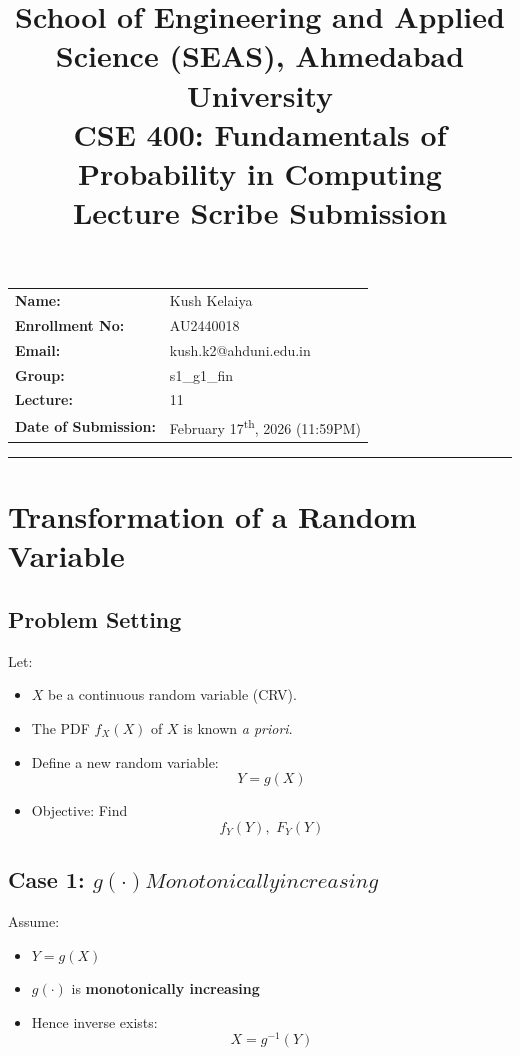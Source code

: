 \documentclass[11pt]{article}
\title{
	\normalsize School of Engineering and Applied Science (SEAS), Ahmedabad University \\
	\vspace{0.2cm}
	\textbf{CSE 400: Fundamentals of Probability in Computing}\\
	\Large Lecture Scribe Submission
}
\author{}
\date{}
\begin{document}
\maketitle

\vspace{-2cm}
\begin{center}
	\begin{tabular}{ll}
		\textbf{Name:} & {Kush Kelaiya \hspace{2.5in}} \\ [1.5ex]
		\textbf{Enrollment No:} & {AU2440018 \hspace{2.5in}} \\ [1.5ex]
		\textbf{Email:} & {kush.k2@ahduni.edu.in \hspace{2.1in}} \\ [1.5ex]
		\textbf{Group: } & s1\_g1\_fin \\ [1.5ex]
		\textbf{Lecture:} & 11 \\ [1.5ex]
		\textbf{Date of Submission:} & {February 17\textsuperscript{th}, 2026 (11:59PM) \hspace{1.2in}}
	\end{tabular}
\end{center}

\hrule
\vspace{0.5cm}

\section{Transformation of a Random Variable}
\subsection{Problem Setting}
Let:
\begin{itemize}
	\item $X$ be a continuous random variable (CRV).
	\item The PDF $f_X(X)$ of $X$ is known \textit{a priori}.
	\item Define a new random variable: $$Y = g(X)$$
	\item Objective: Find $$f_Y(Y),\,\,F_Y(Y)$$
\end{itemize}

\subsection{Case 1: $g(\cdot) Monotonically increasing$}
Assume:
\begin{itemize}
	\item $Y = g(X)$
	\item $g(\cdot)$ is \textbf{monotonically increasing}
	\item Hence inverse exists: $$X = g^{-1}(Y)$$
\end{itemize}
\end{document}
